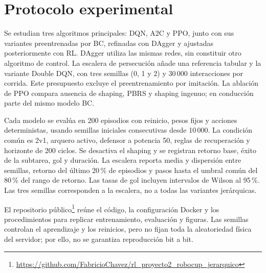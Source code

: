 \section{Protocolo experimental}
Se estudian tres algoritmos principales: DQN, A2C y PPO, junto con sus variantes
preentrenadas por BC, refinadas con DAgger y ajustadas posteriormente con RL.
DAgger utiliza las mismas redes, sin constituir otro algoritmo de control.
La escalera de persecución añade una referencia tabular y la variante Double DQN,
con tres semillas (0, 1 y 2) y 30\,000 interacciones por corrida. Este presupuesto
excluye el preentrenamiento por imitación. La ablación de PPO compara ausencia
de shaping, PBRS y shaping ingenuo; en conducción parte del mismo modelo BC.

Cada modelo se evalúa en 200 episodios con reinicio, pesos fijos y acciones
deterministas, usando semillas iniciales consecutivas desde 10\,000. La condición
común es 2v1, arquero activo, defensor a potencia 50, reglas de recuperación y
horizonte de 200 ciclos. Se desactiva el shaping y se registran retorno base,
éxito de la subtarea, gol y duración. La escalera reporta media y dispersión
entre semillas, retorno del último 20\,\% de episodios y pasos hasta el umbral
común del 80\,\% del rango de retorno. Las tasas de gol incluyen intervalos de
Wilson al 95\,\%. Las tres semillas corresponden a la escalera, no a todas las
variantes jerárquicas.

El repositorio público\footnote{\url{https://github.com/FabricioChavez/rl_proyecto2_robocup_jerarquico}}
reúne el código, la configuración Docker y los procedimientos para replicar
entrenamiento, evaluación y figuras. Las semillas controlan el aprendizaje y
los reinicios, pero no fijan toda la aleatoriedad física del servidor; por ello,
no se garantiza reproducción bit a bit.
